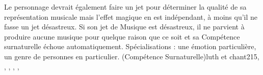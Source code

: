 {{{Le personnage devrait également faire un jet pour déterminer la qualité de sa représentation musicale mais l'effet magique en est indépendant, à moins qu'il ne fasse un jet désastreux. Si son jet de Musique est désastreux, il ne parvient à produire aucune musique pour quelque raison que ce soit et sa Compétence surnaturelle échoue automatiquement. Spécialisations : une émotion particulière, un genre de personnes en particulier. (Compétence Surnaturelle)}}{luth et chant}{2}{15}\sep
{}\sep
{}\sep
{}\sep
{}\sep
{}
}

      



